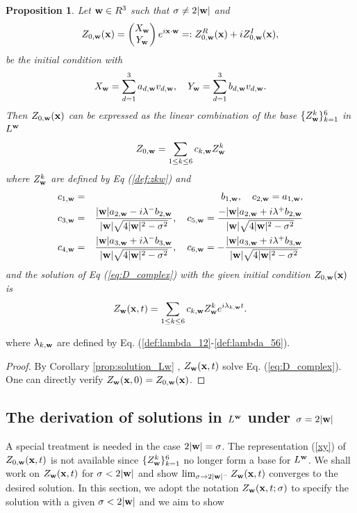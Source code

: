 \documentclass[10pt,reqno]{amsart}
\renewcommand{\(}{\left(}
\renewcommand{\)}{\right)}
\newcommand{\bw}{{\bf w}}
\newcommand{\bx}{\mathbf{x}}
\newtheorem{prop}[theo]{Proposition}
\numberwithin{equation}{section}
\begin{document}
\begin{prop}\label{prop:summary-general} Let $\bw \in R^3$ such that $\sigma\neq 2|\bw|$ and 
	\begin{equation} \label{eq:init_general_sigma}
		Z_{0,\bw}(\bx) = \begin{pmatrix}
			X_{\bw}  \\
			Y_{\bw}
		\end{pmatrix} e^{i\bx \cdot \bw} =: Z^R_{0,\bw}(\bx)  + i Z^I_{0,\bw}(\bx),
	\end{equation}
be the initial condition with
	\begin{equation}\label{eq:Xw_Yw}
		X_{\bw}=\sum_{d=1}^3 a_{d,\bw} v_{d,\bw},  \quad Y_{\bw}=\sum_{d=1}^3 b_{d,\bw} v_{d,\bw}.
	\end{equation}
Then $Z_{0,\bw}(\bx)$ can be expressed as the linear combination of the base $\{Z^k_{\bw}\}^6_{k=1}$ in $L^{\bw}$
	\begin{equation}\label{xy}
		Z_{0,\bw} =\sum_{1\le k\le 6}c_{k,\bw} Z^k_{\bw} 
	\end{equation} 
where $Z^k_{\bw}$ are defined by Eq (\ref{def:zkw}) and 
	\begin{eqnarray}
		c_{1,\bw} &=& b_{1,\bw}, \quad c_{2,\bw} = a_{1,\bw}, \nonumber\\
		c_{3,\bw} &=& \frac{|\bw|a_{2,\bw} - i\lambda^-b_{2,\bw}}{|\bw|\sqrt{4|\bw|^2-\sigma^2}}, \quad c_{5,\bw} = \frac{-|\bw|a_{2,\bw} + i\lambda^+b_{2,\bw}}{|\bw|\sqrt{4|\bw|^2-\sigma^2}}\label{ck}\\
		c_{4,\bw} &=& \frac{|\bw|a_{3,\bw} + i\lambda^- b_{3,\bw}}{|\bw|\sqrt{4|\bw|^2-\sigma^2}}, \quad c_{6,\bw} = -\frac{|\bw|a_{3,\bw} + i\lambda^+b_{3,\bw}}{|\bw|\sqrt{4|\bw|^2-\sigma^2}}\nonumber
	\end{eqnarray}
	and the solution of Eq (\ref{eq:D_complex}) with the given initial condition $Z_{0,\bw}(\bx)$ is   
	\begin{equation}\label{Z_w_general}
		Z_{\bw}(\bx, t) = \sum_{1\le k\le 6} c_{k,\bw}  Z^k_{\bw} e^{i \lambda_{k,\bw} t}.
	\end{equation}
\end{prop}
where $\lambda_{k,\bw} $ are defined by Eq. (\ref{def:lambda_12}-\ref{def:lambda_56}). 
\begin{proof}
By Corollary \ref{prop:solution_Lw} ,  $Z_{\bw}(\bx, t)$ solve Eq. (\ref{eq:D_complex}).  One can directly verify $Z_{\bw}(\bx, 0) = Z_{0,\bw}(\bx) $.
\end{proof}
\subsection{The derivation of solutions in $L^{\bw}$ under  $\sigma=2|\bw|$} \label{subsection-special}
A special treatment is needed in the case $2|\bw|=\sigma$. The representation (\ref{xy}) of $Z_{0,\bw}(\bx, t)$ is not available since $\{Z^k_{\bw}\}^6_{k=1}$ no longer form a base for $L^{\bw}$.  We shall  work on $Z_{\bw}(\bx, t)$ for $\sigma<2|\bw|$ and show $\lim_{\sigma\to 2|\bw|^-}Z_{\bw}(\bx, t)$ converges to the desired solution.  In this section,  we adopt the notation $Z_{\bw}(\bx, t; \sigma)$ to specify the solution with a given $\sigma< 2|\bw|$ and we aim to show 
\end{document}
